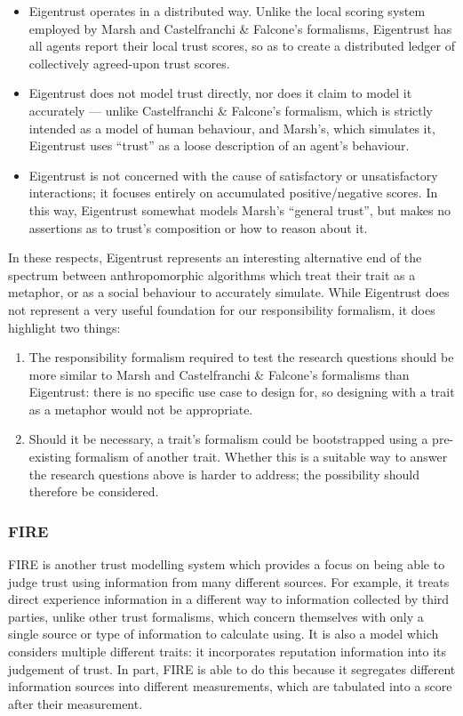 \begin{itemize}
    \item Eigentrust operates in a distributed way. Unlike the local scoring system employed by Marsh and Castelfranchi \& Falcone's formalisms, Eigentrust has all agents report their local trust scores, so as to create a distributed ledger of collectively agreed-upon trust scores.
    \item Eigentrust does not model trust directly, nor does it claim to model it accurately --- unlike Castelfranchi \& Falcone's formalism, which is strictly intended as a model of human behaviour, and Marsh's, which simulates it, Eigentrust uses ``trust'' as a loose description of an agent's behaviour.
    \item Eigentrust is not concerned with the cause of satisfactory or unsatisfactory interactions; it focuses entirely on accumulated positive/negative scores. In this way, Eigentrust somewhat models Marsh's ``general trust'', but makes no assertions as to trust's composition or how to reason about it.
\end{itemize}

In these respects, Eigentrust represents an interesting alternative end of the spectrum between anthropomorphic algorithms which treat their trait as a metaphor, or as a social behaviour to accurately simulate. While Eigentrust does not represent a very useful foundation for our responsibility formalism, it does highlight two things:

\begin{enumerate}
    \item The responsibility formalism required to test the research questions should be more similar to Marsh and Castelfranchi \& Falcone's formalisms than Eigentrust: there is no specific use case to design for, so designing with a trait as a metaphor would not be appropriate.
    \item Should it be necessary, a trait's formalism could be bootstrapped using a pre-existing formalism of another trait. Whether this is a suitable way to answer the research questions above is harder to address; the possibility should therefore be considered.
\end{enumerate}

\subsubsection{FIRE\cite{huynh2004fire}}
FIRE\cite{huynh2004fire} is another trust modelling system which provides a focus on being able to judge trust using information from many different sources. For example, it treats direct experience  information in a different way to information collected by third parties, unlike other trust formalisms, which concern themselves with only a single source or type of information to calculate using. It is also a model which considers multiple different traits: it incorporates reputation information into its judgement of trust. In part, FIRE is able to do this because it segregates different information sources into different measurements, which are tabulated into a score after their measurement.\par

